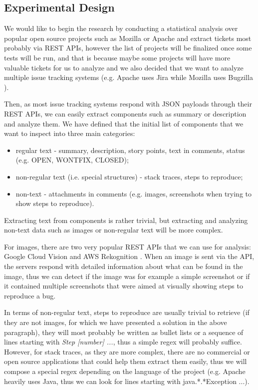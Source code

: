 \documentclass{mprop}
\begin{document}
\subsection{Experimental Design}

We would like to begin the research by conducting a statistical analysis 
over popular open source projects such as Mozilla or Apache and extract 
tickets most probably via REST APIs, however the list of projects
will be finalized once some tests will be run, and that is because
maybe some projects will have more valuable tickets for us to analyze and
we also decided that we want to analyze multiple issue tracking systems 
(e.g. Apache uses Jira \citep{jira} while Mozilla uses Bugzilla 
\citep{bugzilla}). 

Then, as most issue tracking systems respond with JSON payloads through 
their REST APIs, we can easily extract components such as summary or 
description and analyze them. We have defined that the initial list of 
components that we want to inspect into three main categories:
  \begin{itemize}
    \item regular text - summary, description, story points, 
      text in comments, status (e.g. OPEN, WONTFIX, CLOSED);
    \item non-regular text (i.e. special structures) - stack traces,
      steps to reproduce;
    \item non-text - attachments in comments (e.g. images, screenshots
      when trying to show steps to reproduce).
  \end{itemize}

Extracting text from components is rather trivial, but extracting and 
analyzing non-text data such as images or non-regular text will be 
more complex. 

For images, there are two very popular REST APIs that 
we can use for analysis: Google Cloud Vision \citep{vision} and 
AWS Rekognition \citep{rekognition}. When an image is sent via the API,
the servers respond with detailed information about what can be found
in the image, thus we can detect if the image was for example a 
simple screenshot or if it contained multiple screenshots that were aimed
at visually showing steps to reproduce a bug.

In terms of non-regular text, steps to reproduce are usually trivial to
retrieve (if they are not images, for which we have presented a solution
in the above paragraph), they will most probably be written as bullet
lists or a sequence of lines starting with \emph{Step [number] ...}, thus
a simple regex will probably suffice. However, for stack traces, as they
are more complex, there are no commercial or open source applications
that could help them extract them easily, thus we will compose a special
regex depending on the language of the project (e.g. Apache heavily 
uses Java, thus we can look for lines starting with java.*.*Exception ...).
\end{document}
